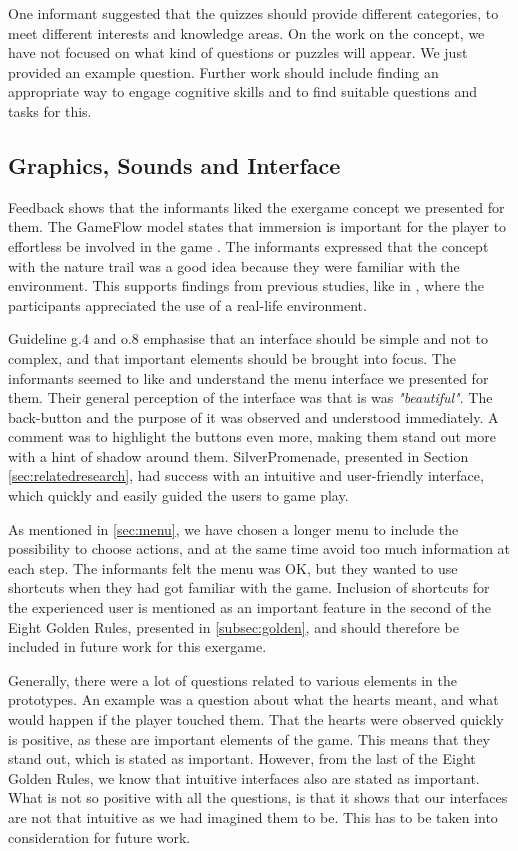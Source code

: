 One informant suggested that the quizzes should provide different categories, to meet different interests and knowledge areas. On the work on the concept, we have not focused on what kind of questions or puzzles will appear. We just provided an example question. Further work should include finding an appropriate way to engage cognitive skills and to find suitable questions and tasks for this. 

\subsection{Graphics, Sounds and Interface}

Feedback shows that the informants liked the exergame concept we presented for them. The GameFlow model states that immersion is important for the player to effortless be involved in the game \cite{sweetser}. The informants expressed that the concept with the nature trail was a good idea because they were familiar with the environment. This supports findings from previous studies, like in \cite{gerling2}, where the participants appreciated the use of a real-life environment.  

Guideline g.4 and o.8 emphasise that an interface should be simple and not to complex, and that important elements should be brought into focus. The informants seemed to like and understand the menu interface we presented for them. Their general perception of the interface was that is was \emph{"beautiful"}. The back-button and the purpose of it was observed and understood immediately. A comment was to highlight the buttons even more, making them stand out more with a hint of shadow around them. SilverPromenade, presented in Section \ref{sec:relatedresearch}, had success with an intuitive and user-friendly interface, which quickly and easily guided the users to game play. 

As mentioned in \ref{sec:menu}, we have chosen a longer menu to include the possibility to choose actions, and at the same time avoid too much information at each step. The informants felt the menu was OK, but they wanted to use shortcuts when they had got familiar with the game. Inclusion of shortcuts for the experienced user is mentioned as an important feature in the second of the Eight Golden Rules, presented in \ref{subsec:golden}, and should therefore be included in future work for this exergame.

Generally, there were a lot of questions related to various elements in the prototypes. An example was a question about what the hearts meant, and what would happen if the player touched them. That the hearts were observed quickly is positive, as these are important elements of the game. This means that they stand out, which is stated as important. However, from the last of the Eight Golden Rules, we know that intuitive interfaces also are stated as important. What is not so positive with all the questions, is that it shows that our interfaces are not that intuitive as we had imagined them to be. This has to be taken into consideration for future work. 

